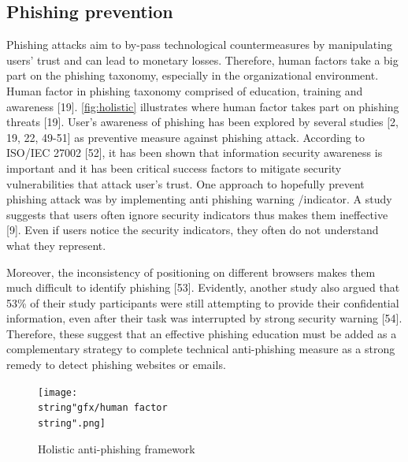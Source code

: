 \subsection{Phishing prevention}

Phishing attacks aim to by-pass technological countermeasures by manipulating
users\textquoteright{} trust and can lead to monetary losses. Therefore,
human factors take a big part on the phishing taxonomy, especially
in the organizational environment. Human factor in phishing taxonomy
comprised of education, training and awareness {[}19{]}. \autoref{fig:holistic}
illustrates where human factor takes part on phishing threats {[}19{]}.
User\textquoteright s awareness of phishing has been explored by several
studies {[}2, 19, 22, 49-51{]} as preventive measure against phishing
attack. According to ISO/IEC 27002 {[}52{]}, it has been shown that
information security awareness is important and it has been critical
success factors to mitigate security vulnerabilities that attack user\textquoteright s
trust. One approach to hopefully prevent phishing attack was by implementing
anti phishing warning /indicator. A study suggests that users often
ignore security indicators thus makes them ineffective {[}9{]}. Even
if users notice the security indicators, they often do not understand
what they represent. 

Moreover, the inconsistency of positioning on different browsers makes
them much difficult to identify phishing {[}53{]}. Evidently, another
study also argued that 53\% of their study participants were still
attempting to provide their confidential information, even after their
task was interrupted by strong security warning {[}54{]}. Therefore,
these suggest that an effective phishing education must be added as
a complementary strategy to complete technical anti-phishing measure
as a strong remedy to detect phishing websites or emails.

\begin{figure}


\begin{centering}
\texttt{[image: \\string"gfx/human factor\\string".png]}\protect\caption{\label{fig:holistic}Holistic anti-phishing framework}

\par\end{centering}

\end{figure}


